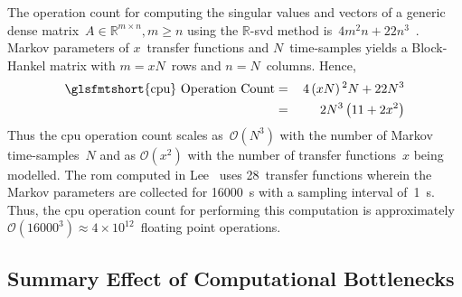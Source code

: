 The    operation    count    for    computing   the    singular    values    and
vectors    of    a    generic    dense    matrix~${\ensuremath{A\in\mathbb{R}^{m
\times   n},m\geq   n}}$    using   the   \mbox{$\mathbb{R}$-\gls{svd}}   method
is~${\ensuremath{4m^{2}n+22n^{3}}}$~\cite{Golub2013}.   Markov   parameters   of
$x$~transfer functions  and $N$~time-samples  yields a Block-Hankel  matrix with
$m=x N$~rows and $n=N$~columns. Hence,
\begin{alignat}{2}
    \text{\glsfmtshort{cpu} Operation  Count} & = & \,4\left(xN\right){}^{2}N+22N^{3}\nonumber \\
                                              & = & \,2N^{3}\left(11+2x^{2}\right)\label{eq:cpu_op_count}
\end{alignat}
Thus  the  \gls{cpu} operation  count  scales  as~${\mathcal{O}(N^{3})}$ with  the
number of Markov time-samples~$N$ and as ${\mathcal{O}(x^{2})}$ with the number of
transfer  functions~$x$ being  modelled. The  \gls{rom} computed  in Lee~\etal{}
uses  28~transfer functions  wherein  the Markov  parameters  are collected  for
\SI{16000}{\second}  with  a sampling  interval  of~\SI{1}{\second}. Thus,  the
\gls{cpu}  operation  count for  performing  this  computation is  approximately
${\mathcal{O}(16000^{3})\approx 4 \times 10^{12}}$~floating point operations.

\subsection{Summary Effect of Computational Bottlenecks}\label{subsec:Summary-Effect-of}

